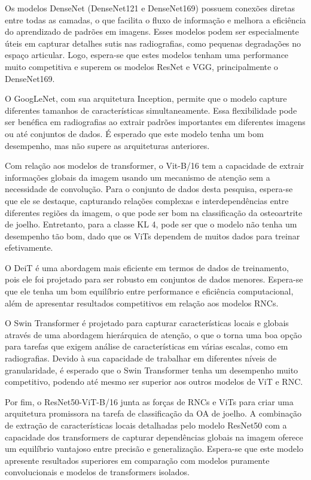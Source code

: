 Os modelos DenseNet (DenseNet121 e DenseNet169) possuem conexões diretas entre todas as camadas, o que facilita o fluxo de informação e melhora a eficiência do aprendizado de padrões em imagens. Esses modelos podem ser especialmente úteis em capturar detalhes sutis nas radiografias, como pequenas degradações no espaço articular. Logo, espera-se que estes modelos tenham uma performance muito competitiva e superem os modelos ResNet e VGG, principalmente o DenseNet169.

O GoogLeNet, com sua arquitetura Inception, permite que o modelo capture diferentes tamanhos de características simultaneamente. Essa flexibilidade pode ser benéfica em radiografias ao extrair padrões importantes em diferentes imagens ou até conjuntos de dados. É esperado que este modelo tenha um bom desempenho, mas não supere as arquiteturas anteriores.

Com relação aos modelos de transformer, o Vit-B/16 tem a capacidade de extrair informações globais da imagem usando um mecanismo de atenção sem a necessidade de convolução. Para o conjunto de dados desta pesquisa, espera-se que ele se destaque, capturando relações complexas e interdependências entre diferentes regiões da imagem, o que pode ser bom na classificação da osteoartrite de joelho. Entretanto, para a classe KL 4, pode ser que o modelo não tenha um desempenho tão bom, dado que os ViTs dependem de muitos dados para treinar efetivamente.

O DeiT é uma abordagem mais eficiente em termos de dados de treinamento, pois ele foi projetado para ser robusto em conjuntos de dados menores. Espera-se que ele tenha um bom equilíbrio entre performance e eficiência computacional, além de apresentar resultados competitivos em relação aos modelos RNCs.

O Swin Transformer é projetado para capturar características locais e globais através de uma abordagem hierárquica de atenção, o que o torna uma boa opção para tarefas que exigem análise de características em várias escalas, como em radiografias. Devido à sua capacidade de trabalhar em diferentes níveis de granularidade, é esperado que o Swin Transformer tenha um desempenho muito competitivo, podendo até mesmo ser superior aos outros modelos de ViT e RNC.

Por fim, o ResNet50-ViT-B/16 junta as forças de RNCs e ViTs para criar uma arquitetura promissora na tarefa de classificação da OA de joelho. A combinação de extração de características locais detalhadas pelo modelo ResNet50 com a capacidade dos transformers de capturar dependências globais na imagem oferece um equilíbrio vantajoso entre precisão e generalização. Espera-se que este modelo apresente resultados superiores em comparação com modelos puramente convolucionais e modelos de transformers isolados.